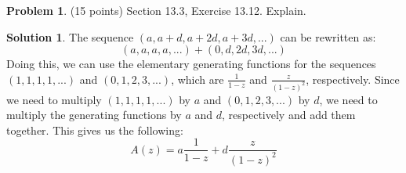 \documentclass{article}
\theoremstyle{definition}
\newtheorem{problem}{Problem}
\newtheorem*{solution}{Solution}
\begin{document}
\newpage
\begin{problem} (15 points) Section 13.3, Exercise 13.12. Explain.
\end{problem}
\begin{solution}
The sequence $(a, a + d, a + 2d, a + 3d, ...)$ can be rewritten as:
$$ (a, a, a, a, ...) + (0, d, 2d, 3d, ...) $$
Doing this, we can use the elementary generating functions for the sequences $(1, 1, 1, 1, ...)$ and $(0, 1, 2, 3, ...)$,
which are $\frac{1}{1 - z}$ and $\frac{z}{(1 - z)^2}$, respectively.
Since we need to multiply $(1, 1, 1, 1, ...)$ by $a$ and $(0, 1, 2, 3, ...)$ by $d$, we need to multiply the generating functions by $a$ and $d$, respectively and add them together.
This gives us the following:
$$ A(z) = a\frac{1}{1 - z} + d\frac{z}{(1 - z)^2} $$
\end{solution}
\end{document}
